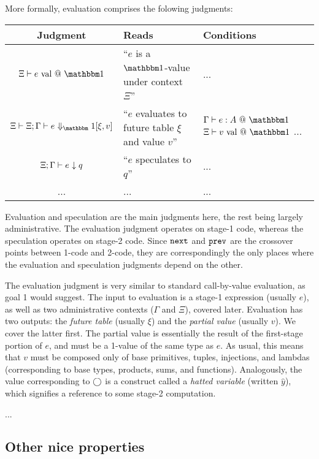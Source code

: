 More formally, evaluation comprises the folowing judgments:

\begin{center}
\begin{tabular}{|c|p{2.5cm}|p{2.5cm}|} \hline
Judgment & Reads & Conditions \\ \hline 
$\isvalone e$ & ``$e$ is a $\bbone$-value under context $\Xi$'' & ... \\ \hline 
$\Xi \vdash \diaonesub$ & ``$e$ evaluates to future table $\xi$ and value $v$'' 
& $\typesone e A$ 
	\newline $\isvalone v$ 
	\newline ... \\ \hline 
${\Xi;\Gamma} \vdash {e_{}} \downarrow {q_{}}$ & ``$e$ speculates to $q$'' & ... \\ \hline 
...&...&... \\ \hline
\end{tabular}
\end{center}

Evaluation and speculation are the main judgments here, the rest being largely administrative.  The evaluation judgment operates on stage-1 code, whereas the speculation operates on stage-2 code.  Since ${\tt next}$ and ${\tt prev}$ are the crossover points between 1-code and 2-code, they are correspondingly the only places where the evaluation and speculation judgments depend on the other. 


The evaluation judgment is very similar to standard call-by-value evaluation, as goal 1 would suggest.  The input to evaluation is a stage-1 expression (usually $e$), as well as two administrative contexts ($\Gamma$ and $\Xi$), covered later.  Evaluation has two outputs: the {\em future table} (usually $\xi$) and the {\em partial value} (usually $v$).  We cover the latter first.  The partial value is essentially the result of the first-stage portion of $e$, and must be a 1-value of the same type as $e$.  As usual, this means that $v$ must be composed only of base primitives, tuples, injections, and lambdas (corresponding to base types, products, sums, and functions).  Analogously, the value corresponding to $\bigcirc$ is a construct called a {\em hatted variable} (written $\hat y$), which signifies a reference to some stage-2 computation.  

...

\subsection{Other nice properties}

